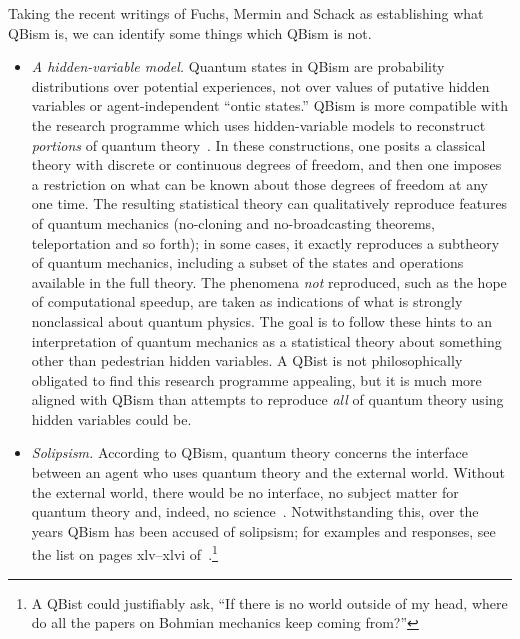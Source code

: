 \documentclass[aps,pra,superscriptaddress,12pt,tightenlines,nofootinbib]{revtex4}
\begin{document}
Taking the recent writings of Fuchs, Mermin and Schack as establishing
what QBism is, we can identify some things which QBism is not.  
\begin{itemize}
\item \emph{A hidden-variable model.}  Quantum states in QBism are
  probability distributions over potential experiences, not over
  values of putative hidden variables or agent-independent ``ontic
  states.''  QBism is more compatible with the research programme
  which uses hidden-variable models to reconstruct \emph{portions} of
  quantum theory~\cite{Spekkens2007, VanEnk2007, Coecke2011,
    Coecke2011b, Bartlett2012, Spekkens2014, Ferrie2014b}.  In these
  constructions, one posits a classical theory with discrete or
  continuous degrees of freedom, and then one imposes a restriction on
  what can be known about those degrees of freedom at any one time.
  The resulting statistical theory can qualitatively reproduce
  features of quantum mechanics (no-cloning and no-broadcasting
  theorems, teleportation and so forth); in some cases, it exactly
  reproduces a subtheory of quantum mechanics, including a subset of
  the states and operations available in the full theory.  The
  phenomena \emph{not} reproduced, such as the hope of computational
  speedup, are taken as indications of what is strongly nonclassical
  about quantum physics.  The goal is to follow these hints to an
  interpretation of quantum mechanics as a statistical theory about
  something other than pedestrian hidden variables.  A QBist is not
  philosophically obligated to find this research programme appealing,
  but it is much more aligned with QBism than attempts to reproduce
  \emph{all} of quantum theory using hidden variables could be.

\item \emph{Solipsism.}  According to QBism, quantum theory concerns
  the interface between an agent who uses quantum theory and the
  external world.  Without the external world, there would be no
  interface, no subject matter for quantum theory and, indeed, no
  science~\cite{RMP, Mermin-Bell}.  Notwithstanding this, over the
  years QBism has been accused of solipsism; for examples and
  responses, see the list on pages xlv--xlvi
  of~\cite{Fuchs2014}.\footnote{A QBist could justifiably ask, ``If
    there is no world outside of my head, where do all the papers on
    Bohmian mechanics keep coming from?''}


\end{itemize}
\end{document}
